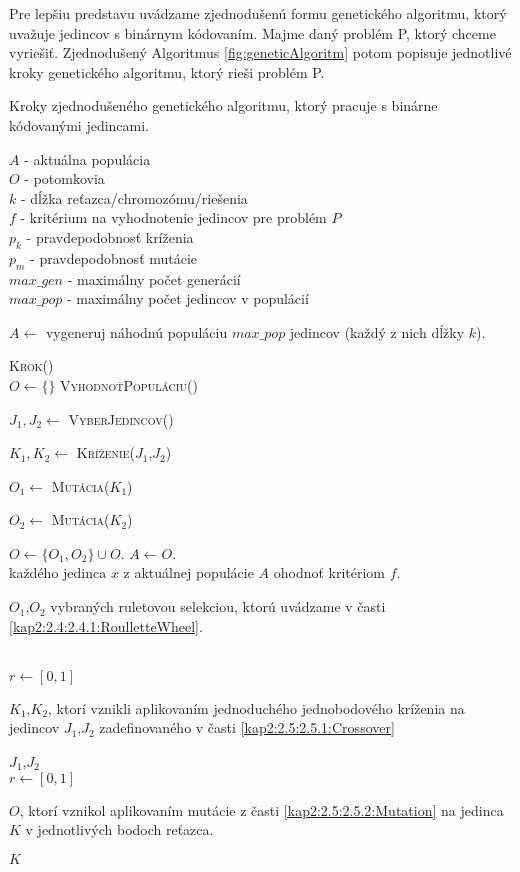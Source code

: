 Pre lepšiu predstavu uvádzame zjednodušenú formu genetického algoritmu, ktorý uvažuje jedincov s binárnym kódovaním. Majme daný problém P, ktorý chceme vyriešiť. Zjednodušený Algoritmus \ref{fig:geneticAlgoritm} potom popisuje jednotlivé kroky genetického algoritmu, ktorý rieši problém P.
\begin{algorithm}
\caption{Kroky zjednodušeného genetického algoritmu, ktorý pracuje s binárne kódovanými jedincami.}\label{fig:geneticAlgoritm}
$A$ - aktuálna populácia \\
$O$ - potomkovia \\
$k$ - dĺžka reťazca/chromozómu/riešenia \\
$f$ - kritérium na vyhodnotenie jedincov pre problém $P$\\
$p_{k}$ - pravdepodobnosť kríženia \\
$p_{m}$ - pravdepodobnosť mutácie \\
$max\_gen$ - maximálny počet generácií \\
$max\_pop$ - maximálny počet jedincov v populácií \\
\begin{algorithmic}[1]

\State \parbox[t]{400pt}{$A \gets $ vygeneruj náhodnú populáciu $max\_pop$ jedincov (každý z nich dĺžky $k$).}

	\State \textsc{Krok()}
\EndFor
\\
	\State $O \gets \{\}$
	\State \textsc{VyhodnoťPopuláciu()}
		\State \parbox[t]{350pt}{$J_1,J_2 \gets $ \textsc{VyberJedincov()}}
		\State \parbox[t]{350pt}{$K_1,K_2 \gets $ \textsc{Kríženie($J_1$,$J_2$)}}
		\State \parbox[t]{350pt}{$O_1 \gets $ \textsc{Mutácia($K_1$)}}
		\State \parbox[t]{350pt}{$O_2 \gets $ \textsc{Mutácia($K_2$)}}
		\State $O \gets \{O_1,O_2\} \cup O$.
	\EndWhile
	\State $A \gets O$.
\EndProcedure
\\
\State každého jedinca $x$ z aktuálnej populácie $A$ ohodnoť kritériom $f$.
\EndProcedure
\\
\State \Return \parbox[t]{300pt}{$O_1$,$O_2$ vybraných ruletovou selekciou, ktorú uvádzame v časti \ref{kap2:2.4:2.4.1:RoulletteWheel}.}
\EndFunction
\\
\State $r \gets [0,1]$
	\State \Return \parbox[t]{300pt}{$K_1$,$K_2$, ktorí vznikli aplikovaním jednoduchého jednobodového kríženia na jedincov $J_1$,$J_2$ zadefinovaného v časti \ref{kap2:2.5:2.5.1:Crossover} }
	\Else 
	\State \Return $J_1$,$J_2$
\EndIf 
\EndFunction
\\
\State $r \gets [0,1]$
	\State \Return \parbox[t]{300pt}{$O$, ktorí vznikol aplikovaním mutácie z časti \ref{kap2:2.5:2.5.2:Mutation} na jedinca $K$ v jednotlivých bodoch reťazca.}
	\Else 
	\State \Return $K$
\EndIf 
\EndFunction
\end{algorithmic}
\end{algorithm}

